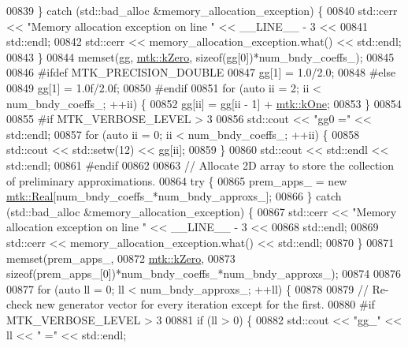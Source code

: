 \begin{DoxyCode}
{{00839   \} \textcolor{keywordflow}{catch} (std::bad\_alloc &memory\_allocation\_exception) \{
00840     std::cerr << \textcolor{stringliteral}{"Memory allocation exception on line "} << \_\_LINE\_\_ - 3 <<
00841       std::endl;
00842     std::cerr << memory\_allocation\_exception.what() << std::endl;
00843   \}
00844   memset(gg, \hyperlink{group__c01-roots_ga59a451a5fae30d59649bcda274fea271}{mtk::kZero}, \textcolor{keyword}{sizeof}(gg[0])*num\_bndy\_coeffs\_);
00845 
00846 \textcolor{preprocessor}{  #ifdef MTK\_PRECISION\_DOUBLE}
00847   gg[1] = 1.0/2.0;
00848 \textcolor{preprocessor}{  #else}
00849   gg[1] = 1.0f/2.0f;
00850 \textcolor{preprocessor}{  #endif}
00851   \textcolor{keywordflow}{for} (\textcolor{keyword}{auto} ii = 2; ii < num\_bndy\_coeffs\_; ++ii) \{
00852     gg[ii] = gg[ii - 1] + \hyperlink{group__c01-roots_ga26407c24d43b6b95480943340d285c71}{mtk::kOne};
00853   \}
00854 
00855 \textcolor{preprocessor}{  #if MTK\_VERBOSE\_LEVEL > 3}
00856   std::cout << \textcolor{stringliteral}{"gg0 ="} << std::endl;
00857   \textcolor{keywordflow}{for} (\textcolor{keyword}{auto} ii = 0; ii < num\_bndy\_coeffs\_; ++ii) \{
00858     std::cout << std::setw(12) << gg[ii];
00859   \}
00860   std::cout << std::endl << std::endl;
00861 \textcolor{preprocessor}{  #endif}
00862 
00863   \textcolor{comment}{// Allocate 2D array to store the collection of preliminary approximations.}
00864   \textcolor{keywordflow}{try} \{
00865     prem\_apps\_ = \textcolor{keyword}{new} \hyperlink{group__c01-roots_gac080bbbf5cbb5502c9f00405f894857d}{mtk::Real}[num\_bndy\_coeffs\_*num\_bndy\_approxs\_];
00866   \} \textcolor{keywordflow}{catch} (std::bad\_alloc &memory\_allocation\_exception) \{
00867     std::cerr << \textcolor{stringliteral}{"Memory allocation exception on line "} << \_\_LINE\_\_ - 3 <<
00868 std::endl;
00869     std::cerr << memory\_allocation\_exception.what() << std::endl;
00870   \}
00871   memset(prem\_apps\_,
00872          \hyperlink{group__c01-roots_ga59a451a5fae30d59649bcda274fea271}{mtk::kZero},
00873          \textcolor{keyword}{sizeof}(prem\_apps\_[0])*num\_bndy\_coeffs\_*num\_bndy\_approxs\_);
00874 
00876 
00877   \textcolor{keywordflow}{for} (\textcolor{keyword}{auto} ll = 0; ll < num\_bndy\_approxs\_; ++ll) \{
00878 
00879     \textcolor{comment}{// Re-check new generator vector for every iteration except for the first.}
00880 \textcolor{preprocessor}{    #if MTK\_VERBOSE\_LEVEL > 3}
00881     \textcolor{keywordflow}{if} (ll > 0) \{
00882       std::cout << \textcolor{stringliteral}{"gg\_"} << ll << \textcolor{stringliteral}{" ="} << std::endl;
}}
\end{DoxyCode}
